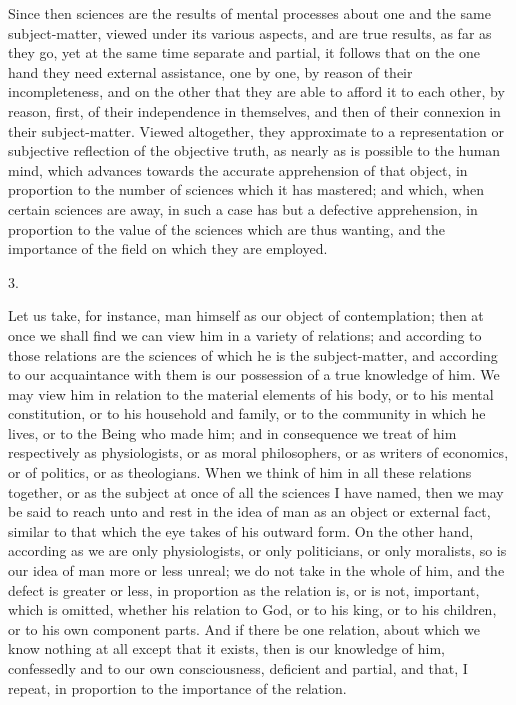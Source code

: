 Since then sciences are the results of mental processes about one
and the same subject-matter, viewed under its various aspects, and are
true results, as far as they go, yet at the same time separate and
partial, it follows that on the one hand they need external
assistance, one by one, by reason of their incompleteness, and on the
other that they are able to afford it to each other, by reason, first,
of their independence in themselves, and then of their connexion in
their subject-matter. Viewed altogether, they approximate to a
representation or subjective reflection of the objective truth, as
nearly as is possible to the human mind, which advances towards the
accurate apprehension of that object, in proportion to the number of
sciences which it has mastered; and which, when certain sciences are
away, in such a case has but a defective apprehension, in proportion
to the value of the sciences which are thus wanting, and the
importance of the field on which they are employed.

3.

Let us take, for instance, man himself as our object of
contemplation; then at once we shall find we can view him in a
variety of relations; and according to those relations are the
sciences of which he is the subject-matter, and according to our
acquaintance with them is our possession of a true knowledge of him.
We may view him in relation to the material elements of his body, or
to his mental constitution, or to his household and family, or to the
community in which he lives, or to the Being who made him; and in
consequence we treat of him respectively as physiologists, or as moral
philosophers, or as writers of economics, or of politics, or as
theologians. When we think of him in all these relations together, or
as the subject at once of all the sciences I have named, then we may
be said to reach unto and rest in the idea of man as an object or
external fact, similar to that which the eye takes of his outward
form. On the other hand, according as we are only physiologists, or
only politicians, or only moralists, so is our idea of man more or
less unreal; we do not take in the whole of him, and the defect is
greater or less, in proportion as the relation is, or is not,
important, which is omitted, whether his relation to God, or to his
king, or to his children, or to his own component parts. And if there
be one relation, about which we know nothing at all except that it
exists, then is our knowledge of him, confessedly and to our own
consciousness, deficient and partial, and that, I repeat, in
proportion to the importance of the relation.

